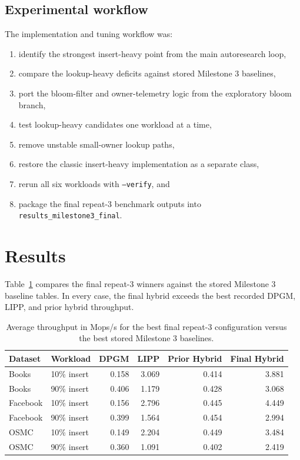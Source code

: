 \documentclass[11pt]{article}
\begin{document}
\subsection*{Experimental workflow}
The implementation and tuning workflow was:
\begin{enumerate}
  \item identify the strongest insert-heavy point from the main autoresearch loop,
  \item compare the lookup-heavy deficits against stored Milestone 3 baselines,
  \item port the bloom-filter and owner-telemetry logic from the exploratory bloom branch,
  \item test lookup-heavy candidates one workload at a time,
  \item remove unstable small-owner lookup paths,
  \item restore the classic insert-heavy implementation as a separate class,
  \item rerun all six workloads with \texttt{--verify}, and
  \item package the final repeat-3 benchmark outputs into \texttt{results\_milestone3\_final}.
\end{enumerate}

\section{Results}
Table~\ref{tab:final-summary} compares the final repeat-3 winners against the stored Milestone 3 baseline tables. In every case, the final hybrid exceeds the best recorded DPGM, LIPP, and prior hybrid throughput.

\begin{table}[H]
\centering
\small
\begin{tabular}{llrrrr}
\toprule
Dataset & Workload & DPGM & LIPP & Prior Hybrid & Final Hybrid \\
\midrule
Books & 10\% insert & 0.158 & 3.069 & 0.414 & 3.881 \\
Books & 90\% insert & 0.406 & 1.179 & 0.428 & 3.068 \\
Facebook & 10\% insert & 0.156 & 2.796 & 0.445 & 4.449 \\
Facebook & 90\% insert & 0.399 & 1.564 & 0.454 & 2.994 \\
OSMC & 10\% insert & 0.149 & 2.204 & 0.449 & 3.484 \\
OSMC & 90\% insert & 0.360 & 1.091 & 0.402 & 2.419 \\
\bottomrule
\end{tabular}
\caption{Average throughput in Mops/s for the best final repeat-3 configuration versus the best stored Milestone 3 baselines.}
\label{tab:final-summary}
\end{table}
\end{document}
